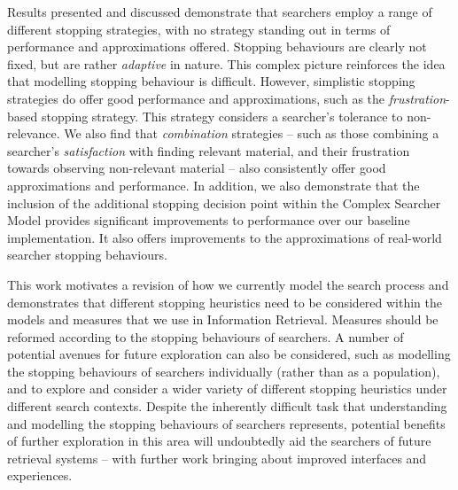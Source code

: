 \begin{preamble}
Results presented and discussed demonstrate that searchers employ a range of different stopping strategies, with no strategy standing out in terms of performance and approximations offered. Stopping behaviours are clearly not fixed, but are rather \emph{adaptive} in nature. This complex picture reinforces the idea that modelling stopping behaviour is difficult. However, simplistic stopping strategies do offer good performance and approximations, such as the \emph{frustration}-based stopping strategy. This strategy considers a searcher's tolerance to non-relevance. We also find that \emph{combination} strategies -- such as those combining a searcher's \emph{satisfaction} with finding relevant material, and their frustration towards observing non-relevant material -- also consistently offer good approximations and performance. In addition, we also demonstrate that the inclusion of the additional stopping decision point within the Complex Searcher Model provides significant improvements to performance over our baseline implementation. It also offers improvements to the approximations of real-world searcher stopping behaviours.

This work motivates a revision of how we currently model the search process and demonstrates that different stopping heuristics need to be considered within the models and measures that we use in Information Retrieval. Measures should be reformed according to the stopping behaviours of searchers. A number of potential avenues for future exploration can also be considered, such as modelling the stopping behaviours of searchers individually (rather than as a population), and to explore and consider a wider variety of different stopping heuristics under different search contexts. Despite the inherently difficult task that understanding and modelling the stopping behaviours of searchers represents, potential benefits of further exploration in this area will undoubtedly aid the searchers of future retrieval systems -- with further work bringing about improved interfaces and experiences.

\end{preamble}